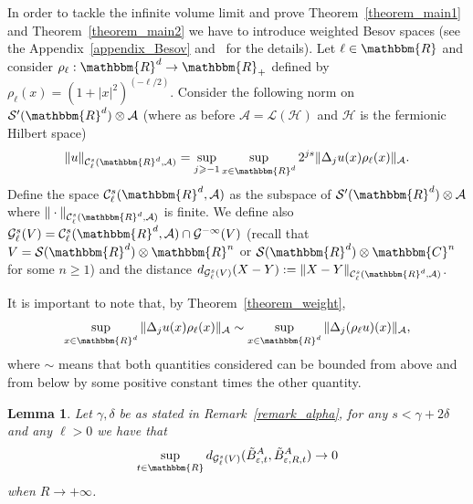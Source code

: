 \documentclass[11pt]{article}
\newcommand{\assign}{:=}
\newtheorem{lemma}{Lemma}
\begin{document}
In order to tackle the infinite volume limit and prove
Theorem~\ref{theorem_main1} and Theorem~\ref{theorem_main2} we have to
introduce weighted Besov spaces (see the Appendix~\ref{appendix_Besov}
and~{\cite{TriebelIII}} for the details). Let $\ell \in \mathbbm{R}$ and
consider $\rho_{\ell} : \mathbbm{R}^d \rightarrow \mathbbm{R}_+$ defined by
$\rho_{\ell} (x) = (1 + | x |^2)^{(- \ell / 2)}$. Consider the following norm
on $\mathcal{S}' (\mathbbm{R}^d) \otimes \mathcal{A}$ (where as before
$\mathcal{A} = \mathcal{L} (\mathcal{H})$ and $\mathcal{H}$ is the fermionic
Hilbert space)
\[ \| u \|_{\mathcal{C}^s_{\ell} (\mathbbm{R}^d, \mathcal{A})} = \sup_{j
   \geqslant - 1} \sup_{x \in \mathbbm{R}^d} 2^{j s} \| \Delta_j u (x)
   \rho_{\ell} (x) \|_{\mathcal{A}} . \]
Define the space $\mathcal{C}^s_{\ell} (\mathbbm{R}^d, \mathcal{A})$ as the
subspace of $\mathcal{S}' (\mathbbm{R}^d) \otimes \mathcal{A}$ where $\| \cdot
\|_{\mathcal{C}^s_{\ell} (\mathbbm{R}^d, \mathcal{A})}$ is finite. We define
also $\mathcal{G}^s_{\ell} (V) = \mathcal{C}^s_{\ell} (\mathbbm{R}^d,
\mathcal{A}) \cap \mathcal{G}^{- \infty} (V)$ (recall that $V =\mathcal{S}
(\mathbbm{R}^d) \otimes \mathbbm{R}^n$ or $\mathcal{S} (\mathbbm{R}^d) \otimes
\mathbbm{C}^n$ for some $n \geqslant 1$) and the distance
$d_{\mathcal{G}^s_{\ell} (V)} (X - Y) \assign \| X - Y
\|_{\mathcal{C}^s_{\ell} (\mathbbm{R}^d, \mathcal{A})}$.

\begin{remark}
  \label{remark_weight}It is important to note that, by
  Theorem~\ref{theorem_weight},
  \[ \sup_{x \in \mathbbm{R}^d} \| \Delta_j u (x) \rho_{\ell} (x)
     \|_{\mathcal{A}} \sim \sup_{x \in \mathbbm{R}^d} \| \Delta_j (\rho_{\ell}
     u) (x) \|_{\mathcal{A}}, \]
  where $\sim$ means that both quantities considered can be bounded from above
  and from below by some positive constant times the other quantity.
\end{remark}

\begin{lemma}
  \label{lemma_convergenceB}Let $\gamma, \delta$ be as stated in
  Remark~\ref{remark_alpha}, for any $s < \gamma + 2 \delta$ and any $\ell >
  0$ we have that
  \[ \sup_{t \in \mathbbm{R}} d_{\mathcal{G}^s_{\ell} (V)}
     (\tilde{B}_{\varepsilon, t}^A, \tilde{B}^A_{\varepsilon, R, t})
     \rightarrow 0 \]
  when $R \rightarrow + \infty$.
\end{lemma}
\end{document}
